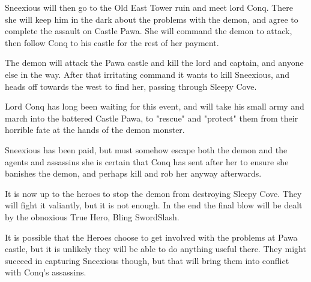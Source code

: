 Sneexious will then go to the Old East Tower ruin and meet lord Conq. There she will keep him in the dark about the problems with the demon, and agree to complete the assault on Castle Pawa. She will command the demon to attack, then follow Conq to his castle for the rest of her payment.

The demon will attack the Pawa castle and kill the lord and captain, and anyone else in the way. After that irritating command it wants to kill Sneexious, and heads off towards the west to find her, passing through Sleepy Cove.

Lord Conq has long been waiting for this event, and will take his small army and march into the battered Castle Pawa, to "rescue" and "protect" them from their horrible fate at the hands of the demon monster.

Sneexious has been paid, but must somehow escape both the demon and the agents and assassins she is certain that Conq has sent after her to ensure she banishes the demon, and perhaps kill and rob her anyway afterwards.

It is now up to the heroes to stop the demon from destroying Sleepy Cove. They will fight it valiantly, but it is not enough. In the end the final blow will be dealt by the obnoxious True Hero, Bling SwordSlash.

It is possible that the Heroes choose to get involved with the problems at Pawa castle, but it is unlikely they will be able to do anything useful there. They might succeed in capturing Sneexious though, but that will bring them into conflict with Conq's assassins.




